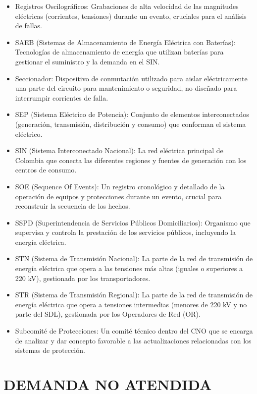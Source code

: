 \documentclass[a5paper]{book}%
\begin{document}
{\begin{itemize}
		\item Registros Oscilográficos: Grabaciones de alta velocidad de las magnitudes eléctricas (corrientes, tensiones) durante un evento, cruciales para el análisis de fallas.
		\item SAEB (Sistemas de Almacenamiento de Energía Eléctrica con Baterías): Tecnologías de almacenamiento de energía que utilizan baterías para gestionar el suministro y la demanda en el SIN.
		\item Seccionador: Dispositivo de conmutación utilizado para aislar eléctricamente una parte del circuito para mantenimiento o seguridad, no diseñado para interrumpir corrientes de falla.
		\item SEP (Sistema Eléctrico de Potencia): Conjunto de elementos interconectados (generación, transmisión, distribución y consumo) que conforman el sistema eléctrico.
		\item SIN (Sistema Interconectado Nacional): La red eléctrica principal de Colombia que conecta las diferentes regiones y fuentes de generación con los centros de consumo.
		\item SOE (Sequence Of Events): Un registro cronológico y detallado de la operación de equipos y protecciones durante un evento, crucial para reconstruir la secuencia de los hechos.
		\item SSPD (Superintendencia de Servicios Públicos Domiciliarios): Organismo que supervisa y controla la prestación de los servicios públicos, incluyendo la energía eléctrica.
		\item STN (Sistema de Transmisión Nacional): La parte de la red de transmisión de energía eléctrica que opera a las tensiones más altas (iguales o superiores a 220 kV), gestionada por los transportadores.
		\item STR (Sistema de Transmisión Regional): La parte de la red de transmisión de energía eléctrica que opera a tensiones intermedias (menores de 220 kV y no parte del SDL), gestionada por los Operadores de Red (OR).
		\item Subcomité de Protecciones: Un comité técnico dentro del CNO que se encarga de analizar y dar concepto favorable a las actualizaciones relacionadas con los sistemas de protección.
\end{itemize}}


\section{DEMANDA NO ATENDIDA}
\end{document}
